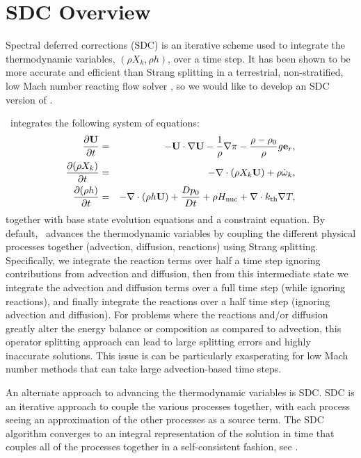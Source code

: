 \section{SDC Overview}

Spectral deferred corrections (SDC) is an iterative scheme used to integrate
the thermodynamic variables, $(\rho X_k,\rho h)$, over a time step.  It has
been shown to be more accurate and efficient than Strang splitting in a
terrestrial, non-stratified, low Mach number reacting flow solver \cite{Non11},
so we would like to develop an SDC version of \maestro.

\maestro\ integrates the following system of equations:
\begin{eqnarray}
\frac{\partial{\bf U}}{\partial t} &=& 
    -{\bf U}\cdot\nabla{\bf U}  - \frac{1}{\rho}\nabla\pi 
    - \frac{\rho-\rho_0}{\rho} g{\bf e}_r,\label{eq:momentum}\\
\frac{\partial(\rho X_k)}{\partial t} &=& 
    -\nabla\cdot(\rho X_k{\bf U}) + \rho\dot{\omega}_k,\label{eq:species}\\
\frac{\partial(\rho h)}{\partial t} &=& 
    -\nabla\cdot(\rho h{\bf U}) + \frac{Dp_0}{Dt} 
    + \rho{H_{\rm nuc}} + \nabla\cdot k_{\rm th}\nabla T,\label{eq:enthalpy}
\end{eqnarray}
together with base state evolution equations and a constraint equation.
By default, \maestro\ advances the thermodynamic variables by coupling
the different physical processes together (advection, diffusion, reactions) using
Strang splitting.  Specifically, we integrate the reaction terms 
over half a time step ignoring contributions from advection and diffusion,
then from this intermediate state we integrate the advection and diffusion terms over
a full time step (while ignoring reactions), and finally
integrate the reactions over a half time step (ignoring advection and diffusion).
For problems where
the reactions and/or diffusion greatly alter the energy balance or composition 
as compared to advection, this operator splitting approach can lead to large 
splitting errors and highly inaccurate solutions.
This issue is can be particularly exasperating 
for low Mach number methods that can take large advection-based time steps.

An alternate approach to advancing the thermodynamic variables is SDC. 
SDC is an iterative approach to couple the various processes
together, with each process seeing an 
approximation of the other processes as a source term.  The SDC
algorithm converges to an integral representation of the solution in
time that couples all of the processes together in a self-consistent
fashion, see \cite{Non11}.

